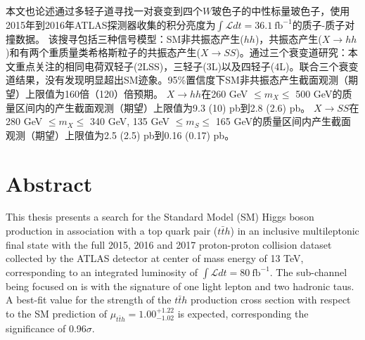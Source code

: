 本文也论述通过多轻子道寻找一对衰变到四个$W$玻色子的中性标量玻色子，使用2015年到2016年ATLAS探测器收集的积分亮度为$\int \mathcal{L}dt=36.1~\text{fb}^{-1}$的质子-质子对撞数据。
该搜寻包括三种信号模型：SM非共振态产生($hh$)，共振态产生($X\rightarrow hh$)和有两个重质量类希格斯粒子的共振态产生($X\rightarrow SS$)。通过三个衰变道研究：本文重点关注的相同电荷双轻子(2LSS)，三轻子(3L)以及四轻子(4L)。联合三个衰变道结果，没有发现明显超出SM迹象。95\%置信度下SM非共振态产生截面观测（期望）上限值为160倍（120）倍预期。
$X\rightarrow hh$在260 GeV $\leq m_X\leq$ 500 GeV的质量区间内的产生截面观测（期望）上限值为9.3 (10) pb到2.8 (2.6) pb。
$X\rightarrow SS$在280 GeV $\leq m_X\leq$ 340 GeV, 135 GeV $\leq m_S\leq$ 165 GeV的质量区间内产生截面观测（期望）上限值为2.5 (2.5) pb到0.16 (0.17) pb。

\chapter*{Abstract}%

This thesis presents a search for the Standard Model (SM) Higgs boson production in association with a top quark pair ($t\bar{t}h$)
 in an inclusive multileptonic final state with the full 2015, 2016 and 2017 proton-proton collision dataset collected by
the ATLAS detector at center of mass energy of 13 TeV, corresponding to an integrated luminosity of $\int \mathcal{L}dt=80~\text{fb}^{-1}$.
The sub-channel being focused on is \ltwotau with the signature of one light lepton and two hadronic taus. A best-fit value for the strength of the $t\bar{t}h$ production cross section
with respect to the SM prediction of $\mu_{t\bar{t}h}=1.00^{+1.22}_{-1.02}$ is expected, corresponding the significance of 0.96$\sigma$.

